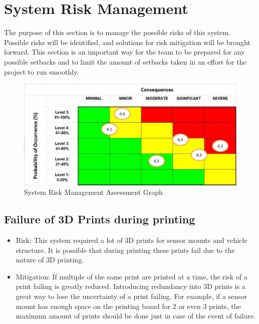 \documentclass[11pt]{report}
\begin{document}
\chapter{System Risk Management}\label{ch:system-risk-management}
The purpose of this section is to manage the possible risks of this system. Possible risks will be identified, and solutions for risk mitigation will be brought forward. This section is an important way for the team to be prepared for any possible setbacks and to limit the amount of setbacks taken in an effort for the project to run smoothly.

\begin{figure}[H]
    \centering
    \includegraphics[width=0.8\linewidth]{Graphs/SystemRiskManagementGraph.pdf}
    \caption{System Risk Management Assessment Graph}
    \label{fig:system-management}
\end{figure}

\section{Failure of 3D Prints during printing}
\begin{itemize}
    \item Risk: This system required a lot of 3D prints for sensor mounts and vehicle structure. It is possible that during printing these prints fail due to the nature of 3D printing. 
    \item Mitigation: If multiple of the same print are printed at a time, the risk of a print failing is greatly reduced. Introducing redundancy into 3D prints is a great way to lose the uncertainty of a print failing. For example, if a sensor mount has enough space on the printing board for 2 or even 3 prints, the maximum amount of prints should be done just in case of the event of failure. 
\end{itemize}
\end{document}
